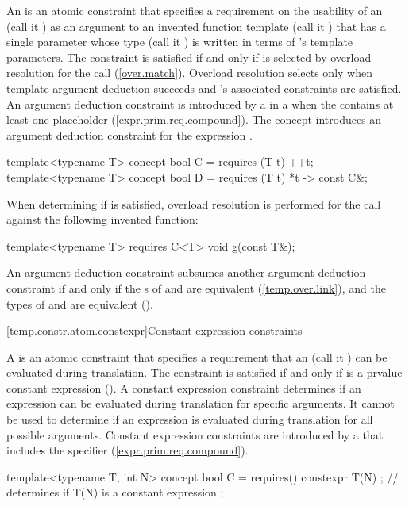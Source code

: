 \pnum
 An  is an atomic
constraint that specifies a requirement on 
the usability of an  
(call it ) as an argument to an invented 
function template (call it ) that has a single 
parameter whose type (call it ) is
written in terms of 's template parameters.
% 
The constraint is satisfied if and only if 
is selected by overload resolution for the call 
(\ref{over.match}).
% 
\enternote
Overload resolution selects  only when template 
argument deduction succeeds and 's associated 
constraints are satisfied.
\exitnote
% 
\enternote
An argument deduction constraint is introduced by a
 in a
 when the
contains at least one placeholder
(\ref{expr.prim.req.compound}).
\exitnote
% 
\enterexample
The concept  introduces an argument deduction 
constraint for the expression .
\begin{codeblock}
template<typename T> concept bool C = requires (T t) { ++t; }
template<typename T> concept bool D = requires (T t) { *t -> const C&; }
\end{codeblock}
When determining if  is satisfied, overload resolution
is performed for the call  against the following 
invented function:
\begin{codeblock}
template<typename T> requires C<T> void g(const T&);
\end{codeblock}
\exitexample
          
\pnum
 An argument deduction constraint  subsumes
another argument deduction constraint  if and only
if the s of
 and  are equivalent
(\ref{temp.over.link}), and the types
of  and  are equivalent
(). 


[temp.constr.atom.constexpr]{Constant expression constraints}

\pnum
A  is an atomic
constraint that specifies a requirement that
an  (call it ) 
can be evaluated during translation. The constraint is satisfied if 
and only if  is a prvalue constant expression 
().
% 
\enternote
A constant expression constraint determines if an expression can be
evaluated during translation for specific 
arguments. It cannot be used to determine if an expression is
evaluated during translation for all possible arguments.
\exitnote
% 
\enternote
Constant expression constraints are introduced by a
 that
includes the  specifier
(\ref{expr.prim.req.compound}).
\exitnote
% 
\enterexample
\begin{codeblock}
template<typename T, int N> concept bool C = 
  requires() {
    constexpr { T(N) }; // determines if T(N) is a constant expression
  };
\end{codeblock}
\exitexample


